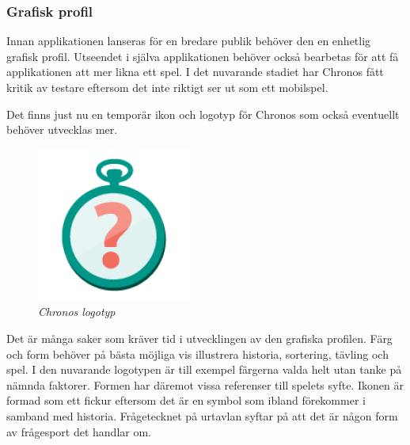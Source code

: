 \documentclass[a4paper, 11pt]{article}
\begin{document}
\subsubsection{Grafisk profil}
Innan applikationen lanseras för en bredare publik behöver den en enhetlig grafisk profil. Utseendet i själva applikationen behöver också bearbetas för att få applikationen att mer likna ett spel. I det nuvarande stadiet har Chronos fått kritik av testare eftersom det inte riktigt ser ut som ett mobilspel. 

Det finns just nu en temporär ikon och logotyp för Chronos som också eventuellt behöver utvecklas mer.

\begin{figure}[H]
	\begin{center}
	\includegraphics[]{ic_launcher} 
	\end{center}
	\caption{\textit{Chronos logotyp}}
\end{figure}

Det är många saker som kräver tid i utvecklingen av den grafiska profilen. Färg och form behöver på bästa möjliga vis illustrera historia, sortering, tävling och spel. I den nuvarande logotypen är till exempel färgerna valda helt utan tanke på nämnda faktorer. Formen har däremot vissa referenser till spelets syfte. Ikonen är formad som ett fickur eftersom det är en symbol som ibland förekommer i samband med historia. Frågetecknet på urtavlan syftar på att det är någon form av frågesport det handlar om.
\end{document}
